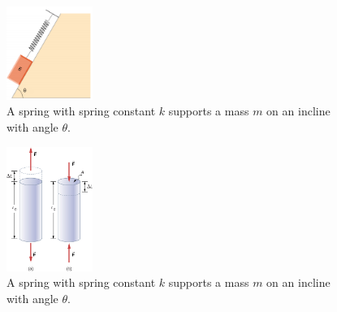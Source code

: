 \documentclass{article}
\begin{document}
\begin{figure}[hb]
\centering
\includegraphics[width=0.25\textwidth]{figures/spring_incline.png}
\caption{\label{fig:1} A spring with spring constant $k$ supports a mass $m$ on an incline with angle $\theta$.}
\end{figure}

\begin{figure}[hb]
\centering
\includegraphics[width=0.25\textwidth]{figures/strain.jpeg}
\caption{\label{fig:2} A spring with spring constant $k$ supports a mass $m$ on an incline with angle $\theta$.}
\end{figure}
\end{document}
